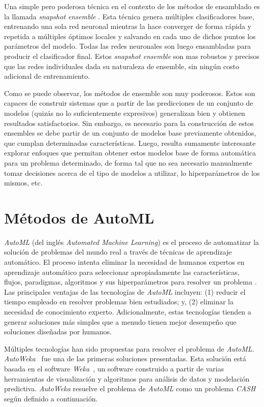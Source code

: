 Una simple pero poderosa técnica en el contexto de los métodos de ensamblado es la llamada \textit{snapshot ensemble} \parencite{huang17snapshot}. Esta técnica genera múltiples clasificadores base, entrenando una sola red neuronal mientras la hace converger de forma rápida y repetida a múltiples óptimos locales y salvando en cada uno de dichos puntos los parámetros del modelo. Todas las redes neuronales son luego ensambladas para producir el clasificador final. Estos \textit{snapshot ensemble} son mas robustos y precisos que las redes individuales dada su naturaleza de ensemble, sin ningún costo adicional de entrenamiento.

Como se puede observar, los métodos de ensemble son muy poderosos.
Estos son capaces de construir sistemas que a partir de las predicciones de un conjunto de modelos (quizás no lo suficientemente expresivos) generalizan bien y obtienen resultados satisfactorios.
Sin embargo, es necesario para la construcción de estos ensembles se debe partir de un conjunto de modelos base previamente obtenidos, que cumplan determinadas características.
Luego, resulta sumamente interesante explorar enfoques que permitan obtener estos modelos base de forma automática para un problema determinado, de forma tal que no sea necesario manualmente tomar decisiones acerca de el tipo de modelos a utilizar, lo hiperparámetros de los mismos, etc. 

\section{Métodos de AutoML}\label{section:automl}

\emph{AutoML} (del inglés \textit{Automated Machine Learning}) es el proceso de automatizar la solución de problemas del mundo real a través de técnicas de aprendizaje automático.
El proceso intenta eliminar la necesidad de humanos expertos en aprendizaje automático para seleccionar apropiadamente las características, flujos, paradigmas, algoritmos y sus hiperparámetros para resolver un problema \parencite{Dimitrakakis_Liu_Parkes_Radanovic_2019}.
Las principales ventajas de las tecnologías de \emph{AutoML} incluyen:
(1) reducir el tiempo empleado en resolver problemas bien estudiados; y,
(2) eliminar la necesidad de conocimiento experto.
Adicionalmente, estas tecnologías tienden a generar soluciones más simples que a menudo tienen mejor desempeño que soluciones diseñadas por humanos.

Múltiples tecnologías han sido propuestas para resolver el problema de \emph{AutoML}. \emph{AutoWeka}~\parencite{autoweka} fue una de las primeras soluciones presentadas.
Esta solución está basada en el software \emph{Weka}~\parencite{weka}, un software construido a partir de varias herramientas de visualización y algoritmos para análisis de datos y modelación predictiva. \emph{AutoWeka} resuelve el problema de \emph{AutoML} como un problema \emph{CASH} según definido a continuación.


